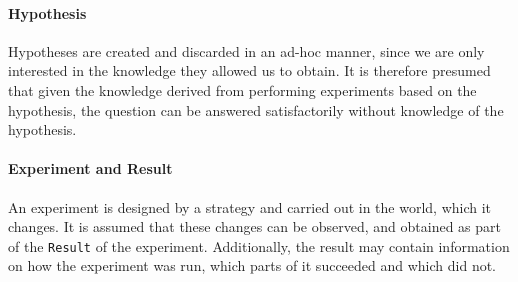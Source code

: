 \documentclass[\master/Master.tex]{subfiles}
\begin{document}
\paragraph*{Hypothesis}
Hypotheses are created and discarded in an ad-hoc manner, since we are only interested in the knowledge they allowed us to obtain. It is therefore presumed that given the knowledge derived from performing experiments based on the hypothesis, the question can be answered satisfactorily without knowledge of the hypothesis.

\paragraph*{Experiment and Result}
An experiment is designed by a strategy and carried out in the world, which it changes. It is assumed that these changes can be observed, and obtained as part of the \texttt{Result} of the experiment. Additionally, the result may contain information on how the experiment was run, which parts of it succeeded and which did not.
\end{document}
